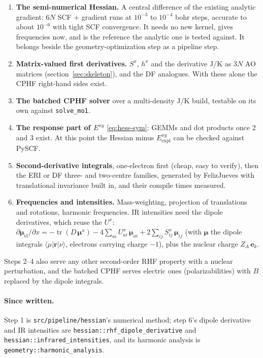\documentclass[11pt]{article}
\newcommand{\code}[1]{\texttt{#1}}
\newcommand{\tr}{\operatorname{tr}}
\newcommand{\Exy}{E^{xy}}
\begin{document}
\begin{enumerate}
  \item \textbf{The semi-numerical Hessian.} A central difference of the
        existing analytic gradient: $6N$ SCF + gradient runs at
        $10^{-3}$ to $10^{-4}$ bohr steps, accurate to about $10^{-6}$
        with tight SCF convergence. It needs no new kernel, gives
        frequencies now, and is the reference the analytic one is tested
        against. It belongs beside the geometry-optimization step as a
        pipeline step.
  \item \textbf{Matrix-valued first derivatives.} $S^x$, $h^x$ and the
        derivative J/K as $3N$ AO matrices (section~\ref{sec:skeleton}),
        and the DF analogues. With these alone the CPHF right-hand sides
        exist.
  \item \textbf{The batched CPHF solver} over a multi-density J/K build,
        testable on its own against \code{solve\_mo1}.
  \item \textbf{The response part of $\Exy$} \eqref{eq:hess-sym}: GEMMs and
        dot products once 2 and 3 exist. At this point the Hessian minus
        $\Exy_{\mathrm{expl}}$ can be checked against PySCF.
  \item \textbf{Second-derivative integrals}, one-electron first (cheap,
        easy to verify), then the ERI or DF three- and two-centre
        families, generated by FelizJueves with translational invariance
        built in, and their compile times measured.
  \item \textbf{Frequencies and intensities.} Mass-weighting, projection of
        translations and rotations, harmonic frequencies. IR intensities
        need the dipole derivatives, which reuse the $U^x$:
        $\partial\boldsymbol\mu_{\mathrm{el}}/\partial x =
        -\tr(D\,\boldsymbol\mu^x) - 4\sum_{ai}U^x_{ai}\,\boldsymbol\mu_{ai}
        + 2\sum_{ij} S^x_{ij}\,\boldsymbol\mu_{ij}$ (with $\boldsymbol\mu$
        the dipole integrals $\langle\mu|\mathbf r|\nu\rangle$, electrons
        carrying charge $-1$), plus the nuclear charge $Z_A\,\mathbf e_k$.
\end{enumerate}

Steps 2--4 also serve any other second-order RHF property with a nuclear
perturbation, and the batched CPHF serves electric ones (polarizabilities)
with $B$ replaced by the dipole integrals.

\paragraph{Since written.} Step 1 is \code{src/pipeline/hessian}'s
numerical method; step 6's dipole derivative and IR intensities are
\code{hessian::rhf\_dipole\_derivative} and
\code{hessian::infrared\_intensities}, and its harmonic analysis is
\code{geometry::harmonic\_analysis}.
\end{document}
